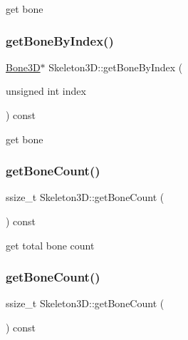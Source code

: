 get bone \mbox{\label{classSkeleton3D_ada0124e128ce586b1e13d8a0ccbb44d5}} 
\subsubsection{\texorpdfstring{get\+Bone\+By\+Index()}{getBoneByIndex()}\hspace{0.1cm}{\footnotesize\ttfamily [2/2]}}
{\footnotesize\ttfamily \hyperlink{classBone3D}{Bone3D}$\ast$ Skeleton3\+D\+::get\+Bone\+By\+Index (\begin{DoxyParamCaption}\item[{unsigned int}]{index }\end{DoxyParamCaption}) const}

get bone \mbox{\label{classSkeleton3D_a20368b5e8e09e2f0d53ba7e27e40909d}} 
\subsubsection{\texorpdfstring{get\+Bone\+Count()}{getBoneCount()}\hspace{0.1cm}{\footnotesize\ttfamily [1/2]}}
{\footnotesize\ttfamily ssize\+\_\+t Skeleton3\+D\+::get\+Bone\+Count (\begin{DoxyParamCaption}{ }\end{DoxyParamCaption}) const}

get total bone count \mbox{\label{classSkeleton3D_a20368b5e8e09e2f0d53ba7e27e40909d}} 
\subsubsection{\texorpdfstring{get\+Bone\+Count()}{getBoneCount()}\hspace{0.1cm}{\footnotesize\ttfamily [2/2]}}
{\footnotesize\ttfamily ssize\+\_\+t Skeleton3\+D\+::get\+Bone\+Count (\begin{DoxyParamCaption}{ }\end{DoxyParamCaption}) const}

